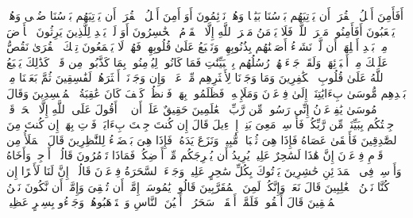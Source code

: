 \startbuffer[\q:7:97]
أَفَأَمِنَ أَهۡلُ ٱلۡقُرَىٰۤ أَن یَأۡتِیَهُم بَأۡسُنَا بَیَٰتࣰا وَهُمۡ نَاۤئِمُونَ%
\stopbuffer%
\startbuffer[\q:7:98]
أَوَ أَمِنَ أَهۡلُ ٱلۡقُرَىٰۤ أَن یَأۡتِیَهُم بَأۡسُنَا ضُحࣰى وَهُمۡ یَلۡعَبُونَ%
\stopbuffer%
\startbuffer[\q:7:99]
أَفَأَمِنُوا۟ مَكۡرَ ٱللَّهِۚ فَلَا یَأۡمَنُ مَكۡرَ ٱللَّهِ إِلَّا ٱلۡقَوۡمُ ٱلۡخَٰسِرُونَ%
\stopbuffer%
\startbuffer[\q:7:100]
أَوَ لَمۡ یَهۡدِ لِلَّذِینَ یَرِثُونَ ٱلۡأَرۡضَ مِنۢ بَعۡدِ أَهۡلِهَاۤ أَن لَّوۡ نَشَاۤءُ أَصَبۡنَٰهُم بِذُنُوبِهِمۡۚ وَنَطۡبَعُ عَلَىٰ قُلُوبِهِمۡ فَهُمۡ لَا یَسۡمَعُونَ%
\stopbuffer%
\startbuffer[\q:7:101]
تِلۡكَ ٱلۡقُرَىٰ نَقُصُّ عَلَیۡكَ مِنۡ أَنۢبَاۤئِهَاۚ وَلَقَدۡ جَاۤءَتۡهُمۡ رُسُلُهُم بِٱلۡبَیِّنَٰتِ فَمَا كَانُوا۟ لِیُؤۡمِنُوا۟ بِمَا كَذَّبُوا۟ مِن قَبۡلُۚ كَذَٰلِكَ یَطۡبَعُ ٱللَّهُ عَلَىٰ قُلُوبِ ٱلۡكَٰفِرِینَ%
\stopbuffer%
\startbuffer[\q:7:102]
وَمَا وَجَدۡنَا لِأَكۡثَرِهِم مِّنۡ عَهۡدࣲۖ وَإِن وَجَدۡنَاۤ أَكۡثَرَهُمۡ لَفَٰسِقِینَ%
\stopbuffer%
\startbuffer[\q:7:103]
ثُمَّ بَعَثۡنَا مِنۢ بَعۡدِهِم مُّوسَىٰ بِءَایَٰتِنَاۤ إِلَىٰ فِرۡعَوۡنَ وَمَلَإِی۟هِۦ فَظَلَمُوا۟ بِهَاۖ فَٱنظُرۡ كَیۡفَ كَانَ عَٰقِبَةُ ٱلۡمُفۡسِدِینَ%
\stopbuffer%
\startbuffer[\q:7:104]
وَقَالَ مُوسَىٰ یَٰفِرۡعَوۡنُ إِنِّی رَسُولࣱ مِّن رَّبِّ ٱلۡعَٰلَمِینَ%
\stopbuffer%
\startbuffer[\q:7:105]
حَقِیقٌ عَلَىٰۤ أَن لَّاۤ أَقُولَ عَلَى ٱللَّهِ إِلَّا ٱلۡحَقَّۚ قَدۡ جِئۡتُكُم بِبَیِّنَةࣲ مِّن رَّبِّكُمۡ فَأَرۡسِلۡ مَعِیَ بَنِیۤ إِسۡرَٰۤءِیلَ%
\stopbuffer%
\startbuffer[\q:7:106]
قَالَ إِن كُنتَ جِئۡتَ بِءَایَةࣲ فَأۡتِ بِهَاۤ إِن كُنتَ مِنَ ٱلصَّٰدِقِینَ%
\stopbuffer%
\startbuffer[\q:7:107]
فَأَلۡقَىٰ عَصَاهُ فَإِذَا هِیَ ثُعۡبَانࣱ مُّبِینࣱ%
\stopbuffer%
\startbuffer[\q:7:108]
وَنَزَعَ یَدَهُۥ فَإِذَا هِیَ بَیۡضَاۤءُ لِلنَّٰظِرِینَ%
\stopbuffer%
\startbuffer[\q:7:109]
قَالَ ٱلۡمَلَأُ مِن قَوۡمِ فِرۡعَوۡنَ إِنَّ هَٰذَا لَسَٰحِرٌ عَلِیمࣱ%
\stopbuffer%
\startbuffer[\q:7:110]
یُرِیدُ أَن یُخۡرِجَكُم مِّنۡ أَرۡضِكُمۡۖ فَمَاذَا تَأۡمُرُونَ%
\stopbuffer%
\startbuffer[\q:7:111]
قَالُوۤا۟ أَرۡجِهۡ وَأَخَاهُ وَأَرۡسِلۡ فِی ٱلۡمَدَاۤئِنِ حَٰشِرِینَ%
\stopbuffer%
\startbuffer[\q:7:112]
یَأۡتُوكَ بِكُلِّ سَٰحِرٍ عَلِیمࣲ%
\stopbuffer%
\startbuffer[\q:7:113]
وَجَاۤءَ ٱلسَّحَرَةُ فِرۡعَوۡنَ قَالُوۤا۟ إِنَّ لَنَا لَأَجۡرًا إِن كُنَّا نَحۡنُ ٱلۡغَٰلِبِینَ%
\stopbuffer%
\startbuffer[\q:7:114]
قَالَ نَعَمۡ وَإِنَّكُمۡ لَمِنَ ٱلۡمُقَرَّبِینَ%
\stopbuffer%
\startbuffer[\q:7:115]
قَالُوا۟ یَٰمُوسَىٰۤ إِمَّاۤ أَن تُلۡقِیَ وَإِمَّاۤ أَن نَّكُونَ نَحۡنُ ٱلۡمُلۡقِینَ%
\stopbuffer%
\startbuffer[\q:7:116]
قَالَ أَلۡقُوا۟ۖ فَلَمَّاۤ أَلۡقَوۡا۟ سَحَرُوۤا۟ أَعۡیُنَ ٱلنَّاسِ وَٱسۡتَرۡهَبُوهُمۡ وَجَاۤءُو بِسِحۡرٍ عَظِیمࣲ%
\stopbuffer%
\startbuffer[\q:7:117]
